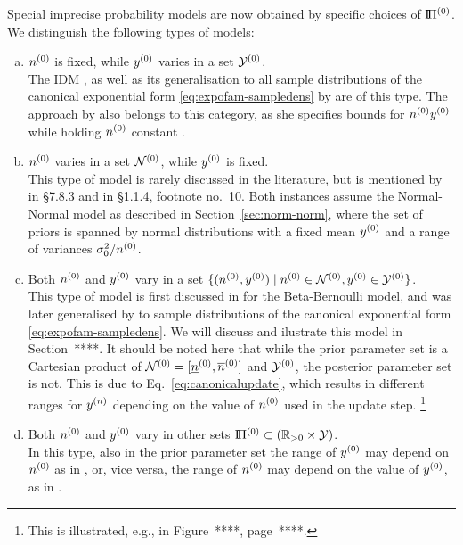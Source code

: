 Special imprecise probability models are now obtained by specific choices of $\text{I}\!\Pi^{(0)}$.
We distinguish the following types of models:
\begin{enumerate}[(a)]
\item $n^{(0)}$ is fixed, while $y^{(0)}$ varies in a set $\mathcal{Y}^{(0)}$.\\
The IDM \parencite{1996:walley::idm},
as well as its generalisation to all sample distributions of the canonical exponential form \eqref{eq:expofam-sampledens}
by \textcite{2005:quaeghebeurcooman} are of this type.
The approach by \textcite{1997:Boratynska} also belongs to this category,
as she specifies bounds for $n^{(0)} y^{(0)}$ while holding $n^{(0)}$ constant \parencite[see][p.~1973]{2012:benavolizaffalon}.
\label{enum:modeltypes-a}
\item $n^{(0)}$ varies in a set $\mathcal{N}^{(0)}$, while $y^{(0)}$ is fixed.\\
\label{enum:varyn}%
This type of model is rarely discussed in the literature,
but is mentioned by \textcite{1991:walley} in {\S 7.8.3} and in {\S 1.1.4}, footnote no.~10.
Both instances assume the Normal-Normal model as described in Section~\ref{sec:norm-norm},
where the set of priors is spanned by normal distributions with a fixed mean $y^{(0)}$ and a range of variances $\sigma_0^2 / n^{(0)}$.
\item Both $n^{(0)}$ and $y^{(0)}$ vary in a set $\{ (n^{(0)}, y^{(0)}) \mid n^{(0)} \in \mathcal{N}^{(0)}, y^{(0)} \in \mathcal{Y}^{(0)} \}$.\\
\label{enum:rectangular}%
This type of model is first discussed in \textcite[\S 5.4.3]{1991:walley} for the Beta-Bernoulli model,
and was later generalised by \textcite{Walter2009a}
to sample distributions of the canonical exponential form \eqref{eq:expofam-sampledens}.
We will discuss and ilustrate this model in Section~****.
It should be noted here that while the prior parameter set is a Cartesian product of $\mathcal{N}^{(0)} = [\underline{n}^{(0)}, \overline{n}^{(0)}]$ and $\mathcal{Y}^{(0)}$,
the posterior parameter set is not.
This is due to Eq.~\eqref{eq:canonicalupdate},
which results in different ranges for $y^{(n)}$ depending on the value of $n^{(0)}$ used in the update step.%
\footnote{This is illustrated, e.g., in Figure~****, page~****.}
\item Both $n^{(0)}$ and $y^{(0)}$ vary in other sets $\text{I}\!\Pi^{(0)} \subset (\mathbb{R}_{>0} \times \mathcal{Y})$.\\
In this type, also in the prior parameter set the range of $y^{(0)}$ may depend on $n^{(0)}$ as in \textcite[\S 2.3]{Walter2011a},
or, vice versa, the range of $n^{(0)}$ may depend on the value of $y^{(0)}$, as in \textcite{2012:benavolizaffalon}.
\label{enum:modeltypes-d}
\end{enumerate}


